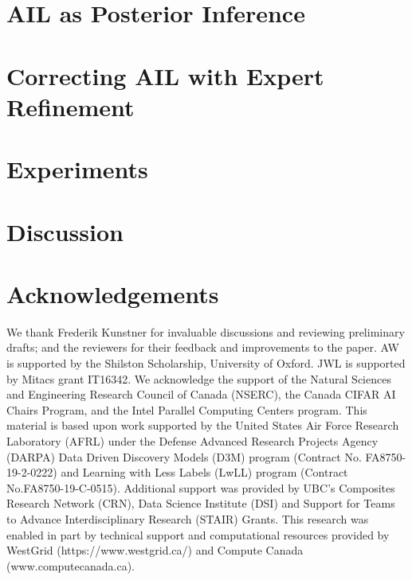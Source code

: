 \documentclass{article}
\begin{document}
\section{AIL as Posterior Inference}


\section{Correcting AIL with Expert Refinement}


\section{Experiments}


\section{Discussion}



\balance

\section{Acknowledgements}
We thank Frederik Kunstner for invaluable discussions and reviewing preliminary drafts; and the reviewers for their feedback and improvements to the paper.  AW is supported by the Shilston Scholarship, University of Oxford.  JWL is supported by Mitacs grant IT16342. We acknowledge the support of the Natural Sciences and Engineering Research Council of Canada (NSERC), the Canada CIFAR AI Chairs Program, and the Intel Parallel Computing Centers program.  This material is based upon work supported by the United States Air Force Research Laboratory (AFRL) under the Defense Advanced Research Projects Agency (DARPA) Data Driven Discovery Models (D3M) program (Contract No. FA8750-19-2-0222) and Learning with Less Labels (LwLL) program (Contract No.FA8750-19-C-0515). Additional support was provided by UBC's Composites Research Network (CRN), Data Science Institute (DSI) and Support for Teams to Advance Interdisciplinary Research (STAIR) Grants. This research was enabled in part by technical support and computational resources provided by WestGrid (https://www.westgrid.ca/) and Compute Canada (www.computecanada.ca).

\clearpage
\balance



\clearpage

\appendix




% 
\end{document}

